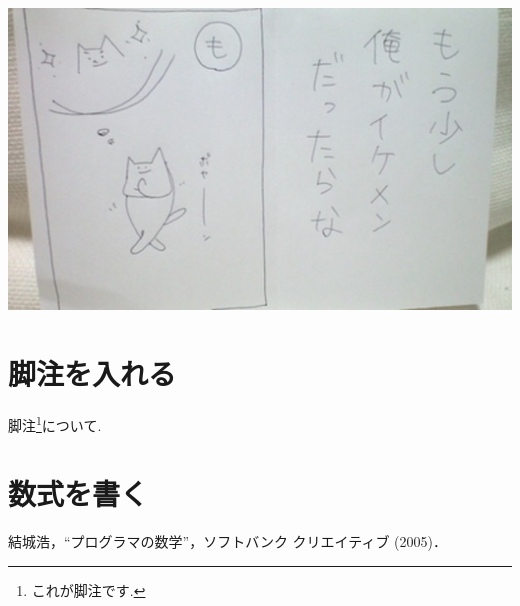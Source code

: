 \documentclass[10pt, twocolumn]{jarticle}
\begin{document}
\includegraphics{sample.eps}

\section{脚注を入れる}

脚注\footnote{これが脚注です.}について.

\section{数式を書く}

\begin{thebibliography}{9}
     結城浩，“プログラマの数学”，ソフトバンク クリエイティブ (2005)．
\end{thebibliography}
\end{document}
